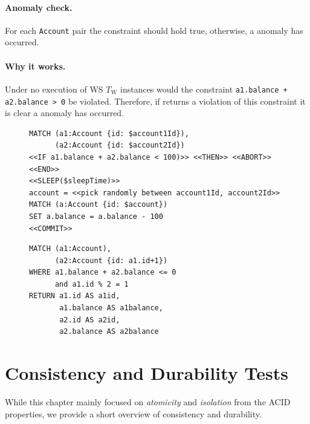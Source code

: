 \paragraph{Anomaly check.}
For each \texttt{Account} pair the constraint should hold true, otherwise, a
 anomaly has occurred.

\paragraph{Why it works.}
Under no  execution of WS $T_\mathrm{W}$ instances would the
constraint \texttt{a1.balance + a2.balance > 0} be violated. Therefore, if
 returns a violation of this constraint it is clear a
 anomaly has occurred.

\begin{figure}[htb]
  \centering
  \begin{minipage}{0.55\linewidth}
    \begin{lstlisting}[language=cypher,label=fig:ws1,caption=\tx{WS $T_\mathrm{W}$}.]
MATCH (a1:Account {id: $account1Id}), 
      (a2:Account {id: $account2Id})
<<IF a1.balance + a2.balance < 100)>> <<THEN>> <<ABORT>> <<END>>
<<SLEEP($sleepTime)>>
account = <<pick randomly between account1Id, account2Id>>
MATCH (a:Account {id: $account})
SET a.balance = a.balance - 100
<<COMMIT>>
\end{lstlisting}
  \end{minipage}
  \quad
  \begin{minipage}{0.33\linewidth}
    \begin{lstlisting}[language=cypher,label=fig:ws2,caption=\tx{WS $T_\mathrm{R}$}.]
MATCH (a1:Account), 
      (a2:Account {id: a1.id+1})
WHERE a1.balance + a2.balance <= 0 
      and a1.id % 2 = 1
RETURN a1.id AS a1id, 
       a1.balance AS a1balance, 
       a2.id AS a2id, 
       a2.balance AS a2balance
\end{lstlisting}
  \end{minipage}
\end{figure}

\newpage

\section{Consistency and Durability Tests}
\label{sec:cd}

While this chapter mainly focused on \emph{atomicity} and \emph{isolation} from
the ACID properties, we provide a short overview of consistency and durability.


